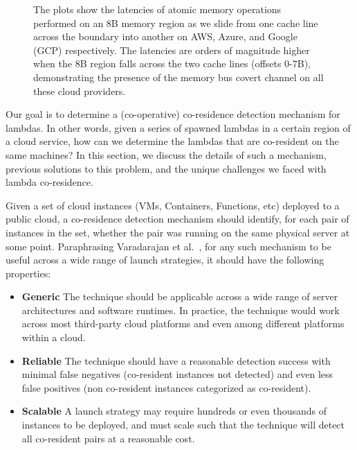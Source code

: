 \begin{figure}[h!]
\begin{subfigure}{.33\textwidth}
\end{subfigure}
\caption{The plots show the latencies of atomic memory operations performed on
        an 8B memory region as we slide from one cache line across the boundary into
        another on AWS, Azure, and Google (GCP) respectively.  The latencies are orders
        of magnitude higher when the 8B region falls across the two cache lines (offsets
        0-7B), demonstrating the presence of the memory bus covert channel on all these
        cloud providers. \label{fig:membus_clouds}}
\label{fig:fig}
\end{figure}


Our goal is to determine a (co-operative) co-residence detection mechanism for
lambdas. In other words, given a series of spawned lambdas in a
certain region of a cloud service, how can we determine the lambdas that are
co-resident on the same machines?  In this section, we discuss the details of
such a mechanism, previous solutions to this problem, and the unique challenges
we faced with lambda co-residence.

Given a set of cloud instances (VMs, Containers, Functions, etc) deployed to a
public cloud, a co-residence detection mechanism should identify, for each pair
of instances in the set, whether the pair was running on the same physical
server at some point. Paraphrasing Varadarajan et al.~\cite{varadarajan2015},
for any such mechanism to be useful across a wide range of launch strategies, it
should have the following properties:

\begin{itemize}
    \item \textbf{Generic} The technique should be applicable across a wide
    range of server architectures and software runtimes. In practice, the
    technique would work across most third-party cloud platforms and even among different
    platforms within a cloud.
    \item \textbf{Reliable} The technique should have a reasonable detection success
    with minimal false negatives (co-resident instances not detected) and even 
    less false positives (non co-resident instances categorized as co-resident).
    \item \textbf{Scalable} A launch strategy may require hundreds or even
    thousands of instances to be deployed, and must scale such that the
    technique will detect all co-resident pairs at a reasonable cost.
\end{itemize}


